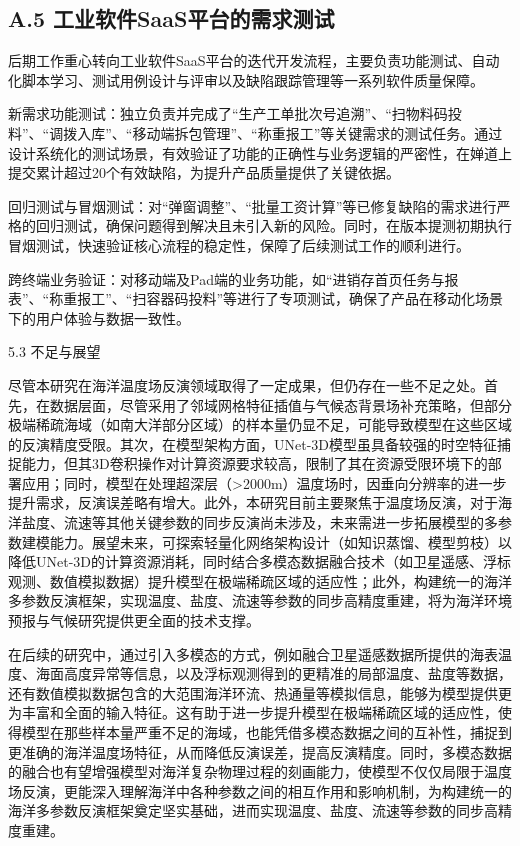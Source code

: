 \documentclass[
  12pt,
]{article}
\begin{document}
\subsection{A.5
工业软件SaaS平台的需求测试}\label{a.5-ux5de5ux4e1aux8f6fux4ef6saasux5e73ux53f0ux7684ux9700ux6c42ux6d4bux8bd5}

后期工作重心转向工业软件SaaS平台的迭代开发流程，主要负责功能测试、自动化脚本学习、测试用例设计与评审以及缺陷跟踪管理等一系列软件质量保障。

新需求功能测试：独立负责并完成了``生产工单批次号追溯''、``扫物料码投料''、``调拨入库''、``移动端拆包管理''、``称重报工''等关键需求的测试任务。通过设计系统化的测试场景，有效验证了功能的正确性与业务逻辑的严密性，在婵道上提交累计超过20个有效缺陷，为提升产品质量提供了关键依据。

回归测试与冒烟测试：对``弹窗调整''、``批量工资计算''等已修复缺陷的需求进行严格的回归测试，确保问题得到解决且未引入新的风险。同时，在版本提测初期执行冒烟测试，快速验证核心流程的稳定性，保障了后续测试工作的顺利进行。

跨终端业务验证：对移动端及Pad端的业务功能，如``进销存首页任务与报表''、``称重报工''、``扫容器码投料''等进行了专项测试，确保了产品在移动化场景下的用户体验与数据一致性。

5.3 不足与展望

尽管本研究在海洋温度场反演领域取得了一定成果，但仍存在一些不足之处。首先，在数据层面，尽管采用了邻域网格特征插值与气候态背景场补充策略，但部分极端稀疏海域（如南大洋部分区域）的样本量仍显不足，可能导致模型在这些区域的反演精度受限。其次，在模型架构方面，UNet-3D模型虽具备较强的时空特征捕捉能力，但其3D卷积操作对计算资源要求较高，限制了其在资源受限环境下的部署应用；同时，模型在处理超深层（\textgreater2000m）温度场时，因垂向分辨率的进一步提升需求，反演误差略有增大。此外，本研究目前主要聚焦于温度场反演，对于海洋盐度、流速等其他关键参数的同步反演尚未涉及，未来需进一步拓展模型的多参数建模能力。展望未来，可探索轻量化网络架构设计（如知识蒸馏、模型剪枝）以降低UNet-3D的计算资源消耗，同时结合多模态数据融合技术（如卫星遥感、浮标观测、数值模拟数据）提升模型在极端稀疏区域的适应性；此外，构建统一的海洋多参数反演框架，实现温度、盐度、流速等参数的同步高精度重建，将为海洋环境预报与气候研究提供更全面的技术支撑。

在后续的研究中，通过引入多模态的方式，例如融合卫星遥感数据所提供的海表温度、海面高度异常等信息，以及浮标观测得到的更精准的局部温度、盐度等数据，还有数值模拟数据包含的大范围海洋环流、热通量等模拟信息，能够为模型提供更为丰富和全面的输入特征。这有助于进一步提升模型在极端稀疏区域的适应性，使得模型在那些样本量严重不足的海域，也能凭借多模态数据之间的互补性，捕捉到更准确的海洋温度场特征，从而降低反演误差，提高反演精度。同时，多模态数据的融合也有望增强模型对海洋复杂物理过程的刻画能力，使模型不仅仅局限于温度场反演，更能深入理解海洋中各种参数之间的相互作用和影响机制，为构建统一的海洋多参数反演框架奠定坚实基础，进而实现温度、盐度、流速等参数的同步高精度重建。
\end{document}
